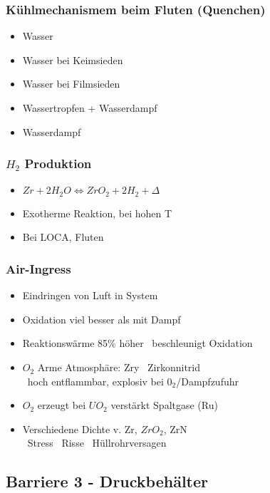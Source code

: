 \documentclass[12pt]{article}
\begin{document}
\subsubsection{Kühlmechanismem beim Fluten (Quenchen)}
\begin{itemize}
	\item Wasser
	\item Wasser bei Keimsieden
	\item Wasser bei Filmsieden
	\item Wassertropfen + Wasserdampf
	\item Wasserdampf
\end{itemize}

\subsubsection{\(H_2\) Produktion}
\begin{itemize}
	\item \(Zr + 2 H_2O \Leftrightarrow ZrO_2 + 2 H_2 + \Delta\)
	\item Exotherme Reaktion, bei hohen T
	\item Bei LOCA, Fluten
\end{itemize}

\subsubsection{Air-Ingress}
\begin{itemize}
	\item Eindringen von Luft in System
	\item Oxidation viel besser als mit Dampf
	\item Reaktionswärme 85\% höher \textrightarrow\ beschleunigt Oxidation
	\item \(O_2\) Arme Atmosphäre: Zry \textrightarrow\ Zirkonnitrid\\
		\textrightarrow\ hoch entflammbar, explosiv bei \(0_2\)/Dampfzufuhr
	\item \(O_2\) erzeugt bei \(UO_2\) verstärkt Spaltgase (Ru)
	\item Verschiedene Dichte v. Zr, \(ZrO_2\), ZrN\\
		\textrightarrow\ Stress \textrightarrow\ Risse \textrightarrow\ Hüllrohrversagen
\end{itemize}

\subsection{Barriere 3 - Druckbehälter}
\end{document}

